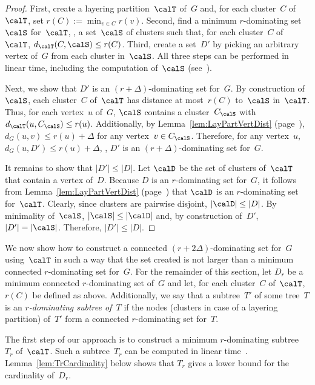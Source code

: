 \begin{proof}
First, create a layering partition~$\calT$ of~$G$ and, for each cluster~$C$ of~$\calT$, set $r(C) := \min_{v \in C} r(v)$.
Second, find a minimum $r$-dominating set~$\calS$ for~$\calT$, \ie, a set~$\calS$ of clusters such that, for each cluster~$C$ of~$\calT$, $d_\calT(C, \calS) \leq r(C)$.
Third, create a set~$D'$ by picking an arbitrary vertex of~$G$ from each cluster in~$\calS$.
All three steps can be performed in linear time, including the computation of~$\calS$ (see~\cite{BranChepDrag1998}).

Next, we show that $D'$ is an $(r + \Delta)$-dominating set for~$G$.
By construction of~$\calS$, each cluster~$C$ of~$\calT$ has distance at most~$r(C)$ to~$\calS$ in~$\calT$.
Thus, for each vertex~$u$ of~$G$, $\calS$ contains a cluster~$C_\calS$ with $d_\calT(u, C_\calS) \leq r(u)$.
Additionally, by Lemma~\ref{lem:LayPartVertDist} (page~\pageref{lem:LayPartVertDist}), $d_G(u, v) \leq r(u) + \Delta$ for any vertex~$v \in C_\calS$.
Therefore, for any vertex~$u$, $d_G(u, D') \leq r(u) + \Delta$, \ie, $D'$ is an $(r + \Delta)$-dominating set for~$G$.

It remains to show that $|D'| \leq |D|$.
Let $\calD$ be the set of clusters of~$\calT$ that contain a vertex of~$D$.
Because $D$ is an $r$-dominating set for~$G$, it follows from Lemma~\ref{lem:LayPartVertDist} (page~\pageref{lem:LayPartVertDist}) that $\calD$ is an $r$-dominating set for~$\calT$.
Clearly, since clusters are pairwise disjoint, $|\calD| \leq |D|$.
By minimality of~$\calS$, $|\calS| \leq |\calD|$ and, by construction of~$D'$, $|D'| = |\calS|$.
Therefore, $|D'| \leq |D|$.
\end{proof}

We now show how to construct a connected $(r + 2 \Delta)$-dominating set for~$G$ using~$\calT$ in such a way that the set created is not larger than a minimum connected $r$-dominating set for~$G$.
For the remainder of this section, let $D_r$ be a minimum connected $r$-dominating set of~$G$ and let, for each cluster~$C$ of~$\calT$, $r(C)$ be defined as above.
Additionally, we say that a subtree~$T'$ of some tree~$T$ is an \emph{\( r \)-dominating subtree of~\( T \)} if the nodes (clusters in case of a layering partition) of~$T'$ form a connected $r$-dominating set for~$T$.

The first step of our approach is to construct a minimum $r$-dominating subtree~$T_r$ of~$\calT$.
Such a subtree~$T_r$ can be computed in linear time~\cite{Dragan1993}.
Lemma~\ref{lem:TrCardinality} below shows that $T_r$ gives a lower bound for the cardinality of~$D_r$.

